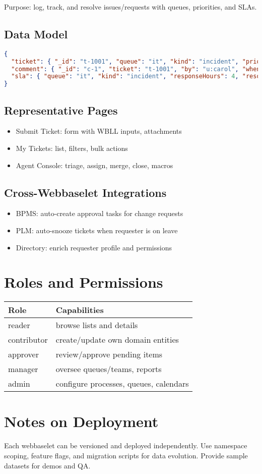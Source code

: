 Purpose: log, track, and resolve issues/requests with queues, priorities, and SLAs.

\subsection{Data Model}
\begin{lstlisting}[language=JSON,caption={Ticket entities}]
{
  "ticket": { "_id": "t-1001", "queue": "it", "kind": "incident", "priority": "high", "status": "open", "subject": "Laptop fan noisy", "requester": "u:carol", "assignee": "it:agent01" },
  "comment": { "_id": "c-1", "ticket": "t-1001", "by": "u:carol", "when": "2025-09-12T09:00:00Z", "text": "Happens after 10min" },
  "sla": { "queue": "it", "kind": "incident", "responseHours": 4, "resolutionHours": 48 }
}
\end{lstlisting}

\subsection{Representative Pages}
\begin{itemize}
  \item Submit Ticket: form with WBLL inputs, attachments
  \item My Tickets: list, filters, bulk actions
  \item Agent Console: triage, assign, merge, close, macros
\end{itemize}

\subsection{Cross-Webbaselet Integrations}
\begin{itemize}
  \item BPMS: auto-create approval tasks for change requests
  \item PLM: auto-snooze tickets when requester is on leave
  \item Directory: enrich requester profile and permissions
\end{itemize}

\section{Roles and Permissions}
\begin{tabularx}{\linewidth}{@{}l X@{}}
\textbf{Role} & \textbf{Capabilities} \\
\hline
reader & browse lists and details \\
contributor & create/update own domain entities \\
approver & review/approve pending items \\
manager & oversee queues/teams, reports \\
admin & configure processes, queues, calendars \\
\end{tabularx}

\section{Notes on Deployment}
Each webbaselet can be versioned and deployed independently. Use namespace scoping, feature flags, and migration scripts for data evolution. Provide sample datasets for demos and QA.
